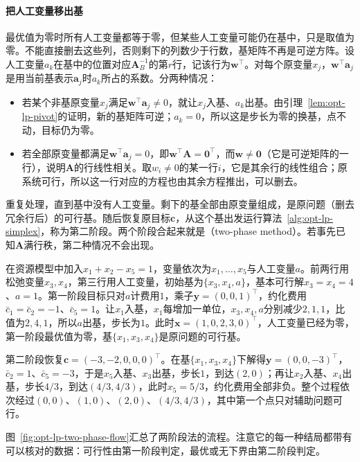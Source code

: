 \paragraph{把人工变量移出基}
最优值为零时所有人工变量都等于零，但某些人工变量可能仍在基中，只是取值为零。不能直接删去这些列，否则剩下的列数少于行数，基矩阵不再是可逆方阵。设人工变量$a_k$在基中的位置对应$\bm A_B^{-1}$的第$r$行，记该行为$\bm w^\top$。对每个原变量$x_j$，$\bm w^\top\bm a_j$是用当前基表示$\bm a_j$时$a_k$所占的系数。分两种情况：
\begin{itemize}
  \item 若某个非基原变量$x_j$满足$\bm w^\top\bm a_j\ne0$，就让$x_j$入基、$a_k$出基。由引理~\ref{lem:opt-lp-pivot}的证明，新的基矩阵可逆；$a_k=0$，所以这是步长为零的换基，点不动，目标仍为零。
  \item 若全部原变量都满足$\bm w^\top\bm a_j=0$，即$\bm w^\top\bm A=\bm 0^\top$，而$\bm w\ne\bm 0$（它是可逆矩阵的一行），说明$\bm A$的行线性相关。取$w_i\ne0$的某一行$i$，它是其余行的线性组合；原系统可行，所以这一行对应的方程也由其余方程推出，可以删去。
\end{itemize}
重复处理，直到基中没有人工变量。剩下的基全部由原变量组成，是原问题（删去冗余行后）的可行基。随后恢复原目标$\bm c$，从这个基出发运行算法~\ref{alg:opt-lp-simplex}，称为第二阶段。两个阶段合起来就是（two-phase method）。若事先已知$\bm A$满行秩，第二种情况不会出现。

\begin{example}[带最低产量的资源模型]
\label{ex:opt-lp-two-phase}
在资源模型中加入$x_1+x_2-x_5=1$，变量依次为$x_1,\dots,x_5$与人工变量$a$。前两行用松弛变量$x_3,x_4$，第三行用人工变量，初始基为$\{x_3,x_4,a\}$，基本可行解$x_3=x_4=4$、$a=1$。第一阶段目标只对$a$计费用$1$，乘子$\bm y=(0,0,1)^\top$，约化费用$\bar c_1=\bar c_2=-1$、$\bar c_5=1$。让$x_1$入基，$x_1$每增加一单位，$x_3,x_4,a$分别减少$2,1,1$，比值为$2,4,1$，所以$a$出基，步长为$1$。此时$\bm x=(1,0,2,3,0)^\top$，人工变量已经为零，第一阶段最优值为零，基$\{x_1,x_3,x_4\}$是原问题的可行基。

第二阶段恢复$\bm c=(-3,-2,0,0,0)^\top$。在基$\{x_1,x_3,x_4\}$下解得$\bm y=(0,0,-3)^\top$，$\bar c_2=1$、$\bar c_5=-3$，于是$x_5$入基、$x_3$出基，步长$1$，到达$(2,0)$；再让$x_2$入基、$x_4$出基，步长$4/3$，到达$(4/3,4/3)$，此时$x_5=5/3$，约化费用全部非负。整个过程依次经过$(0,0)$、$(1,0)$、$(2,0)$、$(4/3,4/3)$，其中第一个点只对辅助问题可行。
\end{example}

图~\ref{fig:opt-lp-two-phase-flow}汇总了两阶段法的流程。注意它的每一种结局都带有可以核对的数据：可行性由第一阶段判定，最优或无下界由第二阶段判定。

